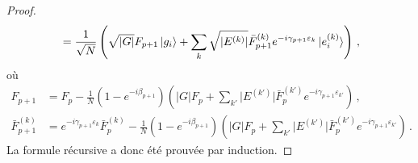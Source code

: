 \begin{proof}
\begin{equation}
\begin{aligned}
&= \frac{1}{\sqrt{ N }} \left( \sqrt{ \lvert G \rvert  } F_{p+1} \ket{g_{i}} + \sum_{k} \sqrt{ \lvert E^{(k)} \rvert  } \bar{F}^{(k)}_{p+1} e^{-i \gamma_{p+1} \varepsilon_{k}} \ket{e^{(k)}_{i}} \right) \,, \\
\end{aligned}
\end{equation}
où
\begin{equation}
\begin{aligned}
F_{p+1} &= F_{p} - \frac{1}{N} (1-e^{-i\beta_{p+1}}) \left( \lvert G \rvert   F_{p} + \sum_{k'} \lvert E^{(k')} \rvert \bar{F}^{(k')}_{p} e^{-i\gamma_{p+1}\varepsilon_{k'}} \right) \,, \\
\bar{F}^{(k)}_{p+1} &= e^{-i\gamma_{p+1} \varepsilon_{k}}\bar{F}_{p}^{(k)} - \frac{1}{N} (1-e^{-i\beta_{p+1}}) \left( \lvert G \rvert   F_{p} + \sum_{k'} \lvert E^{(k')} \rvert \bar{F}^{(k')}_{p} e^{-i\gamma_{p+1}\varepsilon_{k'}} \right) \,.
\end{aligned}
\end{equation}  
La formule récursive a donc été prouvée par induction.
\end{proof}

